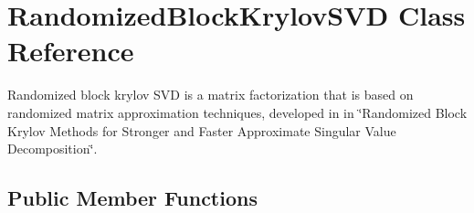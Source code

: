 \section{Randomized\+Block\+Krylov\+S\+VD Class Reference}
\label{classmlpack_1_1svd_1_1RandomizedBlockKrylovSVD}


Randomized block krylov S\+VD is a matrix factorization that is based on randomized matrix approximation techniques, developed in in \char`\"{}\+Randomized Block Krylov Methods for Stronger and Faster Approximate
\+Singular Value Decomposition\char`\"{}.  


\subsection*{Public Member Functions}
